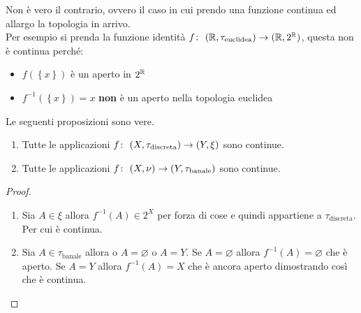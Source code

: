 \begin{remark}
	Non è vero il contrario, ovvero il caso in cui prendo una funzione continua ed allargo la topologia in arrivo. \\ Per esempio si prenda la funzione identità $f \colon\ (\mathbb{R}, \tau_{\text{euclidea}}) \rightarrow (\mathbb{R}, 2^{\mathbb{R}})$, questa non è continua perché:
	\begin{itemize}
		\item $f(\left\{x\right\})$ è un aperto in $2^{\mathbb{R}}$
		\item $f^{-1}(\left\{x\right\}) = x$ \textbf{non} è un aperto nella topologia euclidea
	\end{itemize}
\end{remark}

\begin{theorem}
	Le seguenti proposizioni sono vere.
	\begin{enumerate}
		\item Tutte le applicazioni $f \colon\ (X,\tau_{\text{discreta}}) \rightarrow (Y,\xi)$ sono continue.
		\item Tutte le applicazioni $f \colon\ (X,\nu) \rightarrow (Y,\tau_{\text{banale}})$ sono continue.
	\end{enumerate}
\end{theorem}
\begin{proof}\
	\begin{enumerate}
		\item Sia $A\in \xi$ allora $f^{-1}(A) \in 2^X$ per forza di cose e quindi appartiene a $\tau_{\text{discreta}}$. Per cui è continua.
		\item Sia $A \in \tau_{\text{banale}}$ allora o $A = \varnothing$ o $A = Y$. Se $A = \varnothing$ allora $f^{-1}(A) = \varnothing$ che è aperto. Se $A = Y$ allora $f^{-1}(A) = X$ che è ancora aperto dimostrando così che è continua.
	\end{enumerate}
\end{proof}

